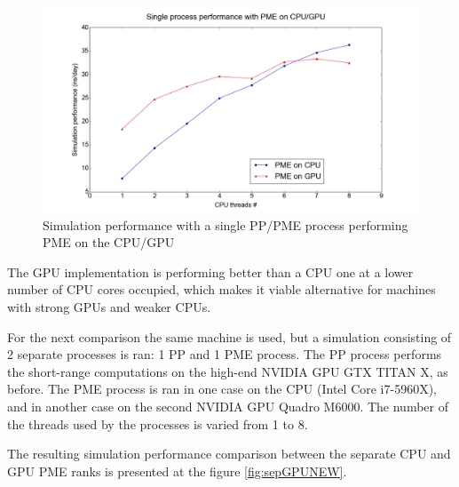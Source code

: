 \documentclass[12pt,a4paper]{report}
\begin{document}
\FloatBarrier
\begin{figure} [h!]
    \centering
    \includegraphics[width=1\textwidth]{pics/CPU_GPU_ADH_SINGLE.png}
    \caption{Simulation performance with a single PP/PME process performing PME on the CPU/GPU}
    \label{fig:sepGPUold}
\end{figure}
\FloatBarrier

The GPU implementation is performing better than a CPU one at a lower number of CPU cores occupied, which makes it viable alternative for machines with strong GPUs and weaker CPUs. 


For the next comparison the same machine is used, but a simulation consisting of 2 separate processes is ran: 1 PP and 1 PME process. The PP process performs the short-range computations on the high-end NVIDIA GPU GTX TITAN X, as before.    
The PME process is ran in one case on the CPU (Intel Core i7-5960X), and in another case on the second NVIDIA GPU Quadro M6000. The number of the threads used by the processes is varied from 1 to 8.
 
The resulting simulation performance comparison between the separate CPU and GPU PME ranks is presented at the figure \ref{fig:sepGPUNEW}.
 
\end{document}
